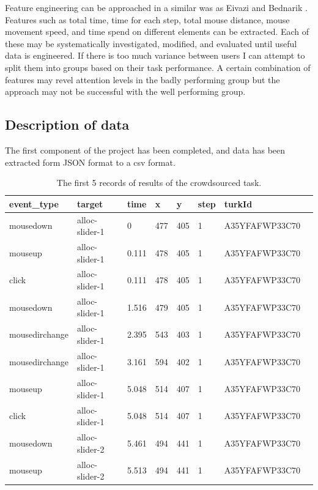\documentclass{article}
\begin{document}
Feature engineering can be approached in a similar was as Eivazi and Bednarik \cite{eivazi2011predicting}.
Features such as total time, time for each step, total mouse distance, mouse movement speed, and time spend on different elements can be extracted.
Each of these may be systematically investigated, modified, and evaluated until useful data is engineered.
If there is too much variance between users I can attempt to split them into groups based on their task performance.
A certain combination of features may revel attention levels in the badly performing group but the approach may not be successful with the well performing group. 


\subsection{Description of data}

The first component of the project has been completed, and data has been extracted form JSON format to a csv format.

\begin{table}[ht]
    \caption{\label{table:data} The first 5 records of results of the crowdsourced task.}

    \begin{tabular}{llllllll}
        \hline
        event\_type    & target         & time  & x   & y   & step & turkId         \\ \hline
        mousedown      & alloc-slider-1 & 0     & 477 & 405 & 1    & A35YFAFWP33C70 \\
        mouseup        & alloc-slider-1 & 0.111 & 478 & 405 & 1    & A35YFAFWP33C70 \\
        click          & alloc-slider-1 & 0.111 & 478 & 405 & 1    & A35YFAFWP33C70 \\
        mousedown      & alloc-slider-1 & 1.516 & 479 & 405 & 1    & A35YFAFWP33C70 \\
        mousedirchange & alloc-slider-1 & 2.395 & 543 & 403 & 1    & A35YFAFWP33C70 \\
        mousedirchange & alloc-slider-1 & 3.161 & 594 & 402 & 1    & A35YFAFWP33C70 \\
        mouseup        & alloc-slider-1 & 5.048 & 514 & 407 & 1    & A35YFAFWP33C70 \\
        click          & alloc-slider-1 & 5.048 & 514 & 407 & 1    & A35YFAFWP33C70 \\
        mousedown      & alloc-slider-2 & 5.461 & 494 & 441 & 1    & A35YFAFWP33C70 \\
        mouseup        & alloc-slider-2 & 5.513 & 494 & 441 & 1    & A35YFAFWP33C70 \\ \hline
    \end{tabular}
\end{table}
\end{document}

